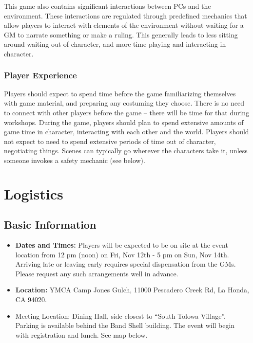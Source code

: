 \documentclass[sheet]{GL2020}
\begin{document}
This game also contains significant interactions between PCs and the environment. These interactions are regulated through predefined mechanics that allow players to interact with elements of the environment without waiting for a GM to narrate something or make a ruling. This generally leads to less sitting around waiting out of character, and more time playing and interacting in character. 

\subsubsection{Player Experience}
Players should expect to spend time before the game familiarizing themselves with game material, and preparing any costuming they choose. There is no need to connect with other players before the game -- there will be time for that during workshops. During the game, players should plan to spend extensive amounts of game time in character, interacting with each other and the world. Players should not expect to need to spend extensive periods of time out of character, negotiating things. Scenes can typically go wherever the characters take it, unless someone invokes a safety mechanic (see below).


\section{Logistics}
\subsection{Basic Information}
\begin{itemize}
  \item \textbf{Dates and Times:} Players will be expected to be on site at the event location from 12 pm (noon) on Fri, Nov 12th - 5 pm on Sun, Nov 14th. Arriving late or leaving early requires special dispensation from the GMs. Please request any such arrangements well in advance.
  \item \textbf{Location:} YMCA Camp Jones Gulch, 11000 Pescadero Creek Rd, La Honda, CA 94020.
  \item Meeting Location: Dining Hall, side closest to ``South Tolowa Village''. Parking is available behind the Band Shell building. The event will begin with registration and lunch. See map below.
\end{itemize}
\end{document}
